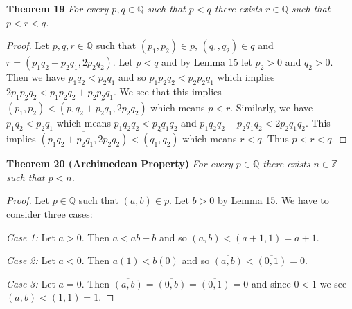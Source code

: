 \documentclass{article}
\begin{document}
\begin{flushleft}
\textbf{Theorem 19}
\textsl{For every $p,q \in \mathbb{Q}$ such that $p<q$ there exists $r \in \mathbb{Q}$ such that $p<r<q$.}
\begin{proof}
Let $p,q,r \in \mathbb{Q}$ such that $(p_1,p_2) \in p$, $(q_1,q_2) \in q$ and $r = \overline{(p_1q_2+p_2q_1,2p_2q_2)}$. Let $p<q$ and by Lemma 15 let $p_2>0$ and $q_2>0$. Then we have $p_1q_2<p_2q_1$ and so $p_1p_2q_2<p_2p_2q_1$ which implies $2p_1p_2q_2<p_1p_2q_2+p_2p_2q_1$. We see that this implies $\overline{(p_1,p_2)} < \overline{(p_1q_2+p_2q_1,2p_2q_2)}$ which means $p<r$. Similarly, we have $p_1q_2<p_2q_1$ which means $p_1q_2q_2<p_2q_1q_2$ and $p_1q_2q_2+p_2q_1q_2<2p_2q_1q_2$. This implies $\overline{(p_1q_2+p_2q_1,2p_2q_2)}<\overline{(q_1,q_2)}$ which means $r<q$. Thus $p<r<q$.
\end{proof}

\textbf{Theorem 20 (Archimedean Property)}
\textsl{For every $p \in \mathbb{Q}$ there exists $n \in \mathbb{Z}$ such that $p<n$.}
\begin{proof}
Let $p \in \mathbb{Q}$ such that $(a,b) \in p$. Let $b>0$ by Lemma 15. We have to consider three cases:\newline

\textsl{Case 1:} Let $a>0$. Then $a<ab+b$ and so $\overline{(a,b)} < \overline{(a+1,1)} = a+1$.\newline

\textsl{Case 2:} Let $a<0$. Then $a(1)<b(0)$ and so $\overline{(a,b)} < \overline{(0,1)} = 0$.\newline

\textsl{Case 3:} Let $a=0$. Then $\overline{(a,b)}=\overline{(0,b)}=\overline{(0,1)}=0$ and since $0<1$ we see $\overline{(a,b)} < \overline{(1,1)} = 1$.
\end{proof}

\end{flushleft}
\end{document}
